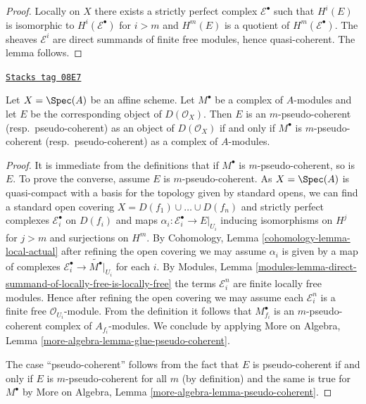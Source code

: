 \begin{proof}
Locally on $X$ there exists a strictly perfect complex $\mathcal{E}^\bullet$
such that $H^i(E)$ is isomorphic to $H^i(\mathcal{E}^\bullet)$ for $i > m$
and $H^m(E)$ is a quotient of $H^m(\mathcal{E}^\bullet)$. The sheaves
$\mathcal{E}^i$ are direct summands of finite free modules,
hence quasi-coherent. The lemma follows.
\end{proof}

\begin{lemma}
\label{perfect-lemma-pseudo-coherent-affine}
\href{https://stacks.math.columbia.edu/tag/08E7}{\texttt{Stacks tag 08E7}}

Let $X = \Spec(A)$ be an affine scheme. Let $M^\bullet$ be a
complex of $A$-modules and let $E$ be the corresponding object
of $D(\mathcal{O}_X)$. Then $E$ is an $m$-pseudo-coherent
(resp.\ pseudo-coherent) as an object of $D(\mathcal{O}_X)$
if and only if $M^\bullet$ is $m$-pseudo-coherent (resp.\ pseudo-coherent)
as a complex of $A$-modules.
\end{lemma}

\begin{proof}
It is immediate from the definitions that if $M^\bullet$ is
$m$-pseudo-coherent, so is $E$. To prove the converse, assume
$E$ is $m$-pseudo-coherent. As $X = \Spec(A)$ is quasi-compact with
a basis for the topology given by standard opens, we can find a standard
open covering $X = D(f_1) \cup \ldots \cup D(f_n)$ and strictly
perfect complexes $\mathcal{E}_i^\bullet$ on $D(f_i)$ and
maps $\alpha_i : \mathcal{E}_i^\bullet \to E|_{U_i}$ inducing
isomorphisms on $H^j$ for $j > m$ and surjections on $H^m$.
By Cohomology, Lemma \ref{cohomology-lemma-local-actual}
after refining the open covering
we may assume $\alpha_i$ is given by a map of complexes
$\mathcal{E}_i^\bullet \to \widetilde{M^\bullet}|_{U_i}$
for each $i$. By Modules, Lemma
\ref{modules-lemma-direct-summand-of-locally-free-is-locally-free}
the terms $\mathcal{E}_i^n$ are finite locally free modules.
Hence after refining the open covering we may assume each
$\mathcal{E}_i^n$ is a finite free $\mathcal{O}_{U_i}$-module.
From the definition it follows that $M^\bullet_{f_i}$ is
an $m$-pseudo-coherent complex of $A_{f_i}$-modules.
We conclude by applying
More on Algebra, Lemma \ref{more-algebra-lemma-glue-pseudo-coherent}.

\medskip\noindent
The case ``pseudo-coherent'' follows from the fact that $E$ is
pseudo-coherent if and only if $E$ is $m$-pseudo-coherent for
all $m$ (by definition) and the same is true for $M^\bullet$
by More on Algebra, Lemma \ref{more-algebra-lemma-pseudo-coherent}.
\end{proof}

